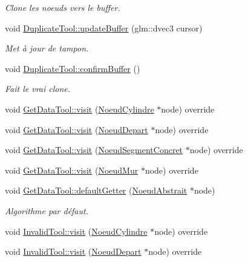 \begin{DoxyCompactItemize}
\begin{DoxyCompactList}\small\item\em Clone les noeuds vers le buffer. \end{DoxyCompactList}\item 
void \hyperlink{group__inf2990_ga2fad36673e41afac22177ca37c6c75ff}{Duplicate\+Tool\+::update\+Buffer} (glm\+::dvec3 cursor)
\begin{DoxyCompactList}\small\item\em Met à jour de tampon. \end{DoxyCompactList}\item 
void \hyperlink{group__inf2990_ga69fcbb20577c85049ca9a5ca8b37091d}{Duplicate\+Tool\+::confirm\+Buffer} ()
\begin{DoxyCompactList}\small\item\em Fait le vrai clone. \end{DoxyCompactList}\item 
void \hyperlink{group__inf2990_ga21292ea905abc9e5c85d04e4ca9b6863}{Get\+Data\+Tool\+::visit} (\hyperlink{class_noeud_cylindre}{Noeud\+Cylindre} $\ast$node) override
\item 
void \hyperlink{group__inf2990_ga4ce08dbc70076e50ec519cd082a9e1ad}{Get\+Data\+Tool\+::visit} (\hyperlink{class_noeud_depart}{Noeud\+Depart} $\ast$node) override
\item 
void \hyperlink{group__inf2990_gae3edeae69aab08455d88459437c1c941}{Get\+Data\+Tool\+::visit} (\hyperlink{class_noeud_segment_concret}{Noeud\+Segment\+Concret} $\ast$node) override
\item 
void \hyperlink{group__inf2990_ga9db0192f32035edd1e4b8c2858feb5d1}{Get\+Data\+Tool\+::visit} (\hyperlink{class_noeud_mur}{Noeud\+Mur} $\ast$node) override
\item 
void \hyperlink{group__inf2990_gab96d72787632de185fd46dee5d8b9750}{Get\+Data\+Tool\+::default\+Getter} (\hyperlink{class_noeud_abstrait}{Noeud\+Abstrait} $\ast$node)
\begin{DoxyCompactList}\small\item\em Algorithme par défaut. \end{DoxyCompactList}\item 
void \hyperlink{group__inf2990_ga55674ebdcf4c31ced5df732e2424d282}{Invalid\+Tool\+::visit} (\hyperlink{class_noeud_cylindre}{Noeud\+Cylindre} $\ast$node) override
\item 
void \hyperlink{group__inf2990_gabbc70a0da4b0aadac5a37f1fce30cb7a}{Invalid\+Tool\+::visit} (\hyperlink{class_noeud_depart}{Noeud\+Depart} $\ast$node) override

\end{DoxyCompactItemize}
